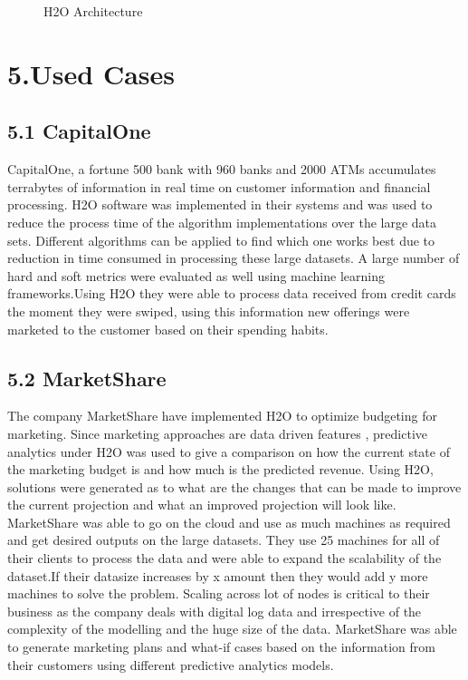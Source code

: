 \documentclass[9pt,twocolumn,twoside]{../../styles/osajnl}
\begin{document}
\begin{figure}[htbp]
\centering
{}
\caption{H2O Architecture\cite{www-h2o-architecture}}
\label{ fig:Architecture of H2O}
\end{figure}


\section {5.Used Cases}

\subsection {5.1 CapitalOne}

CapitalOne, a fortune 500 bank with 960 banks and 2000 ATMs
accumulates terrabytes of information in real time on customer
information and financial processing. H2O software was implemented in their systems and  was used to reduce the
process time of the algorithm implementations over the large data sets\cite{www-h2o-capitalone}. Different algorithms can be applied to find which one
works best due to reduction in time consumed in processing these large
datasets. A large number of hard and soft metrics were evaluated as
well using machine learning frameworks\cite{www-h2o-capitalone}.Using H2O they were able to process data received from credit cards the moment they were swiped, using this information new offerings were marketed to the customer based on their spending habits.

\subsection {5.2 MarketShare}

The company MarketShare have implemented H2O to optimize budgeting for
marketing. Since marketing approaches are data driven features ,
predictive analytics under H2O was used to give a comparison on how
the current state of the marketing budget is and how much is the
predicted revenue\cite{www-h2o-marketshare}. Using H2O, solutions were generated as to what are
the changes that can be made to improve the current projection and
what an improved projection will look like. MarketShare was able to go on the cloud and use as much
machines as required and get desired outputs on the large
datasets. They use 25 machines for all of their clients to process the
data and were able to expand the scalability of the dataset.If their
datasize increases by x amount then they would add y more machines to
solve the problem\cite{www-h2o-marketshare}. Scaling across lot of nodes is critical to their
business as the company deals with digital log data and irrespective
of the complexity of the modelling and the huge size of the data\cite{www-h2o-marketshare}. MarketShare was able to generate marketing plans and what-if cases based on the information from their customers using different predictive analytics models.
\end{document}
